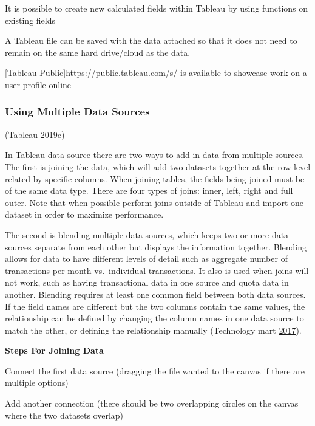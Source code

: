 \documentclass[]{book}
\begin{document}
It is possible to create new calculated fields within Tableau by using functions on existing fields

A Tableau file can be saved with the data attached so that it does not need to remain on the same hard drive/cloud as the data.

{[}Tableau Public{]}\url{https://public.tableau.com/s/} is available to showcase work on a user profile online

\hypertarget{using-multiple-data-sources}{%
\subsubsection{Using Multiple Data Sources}\label{using-multiple-data-sources}}

(Tableau \protect\hyperlink{ref-TableauHelp_connections}{2019}\protect\hyperlink{ref-TableauHelp_connections}{c})

In Tableau data source there are two ways to add in data from multiple sources. The first is joining the data, which will add two datasets together at the row level related by specific columns. When joining tables, the fields being joined must be of the same data type. There are four types of joins: inner, left, right and full outer. Note that when possible perform joins outside of Tableau and import one dataset in order to maximize performance.

The second is blending multiple data sources, which keeps two or more data sources separate from each other but displays the information together. Blending allows for data to have different levels of detail such as aggregate number of transactions per month vs.~individual transactions. It also is used when joins will not work, such as having transactional data in one source and quota data in another. Blending requires at least one common field between both data sources. If the field names are different but the two columns contain the same values, the relationship can be defined by changing the column names in one data source to match the other, or defining the relationship manually (Technology mart \protect\hyperlink{ref-datablendingintableau}{2017}).

\textbf{Steps For Joining Data}

Connect the first data source (dragging the file wanted to the canvas if there are multiple options)

Add another connection (there should be two overlapping circles on the canvas where the two datasets overlap)
\end{document}
